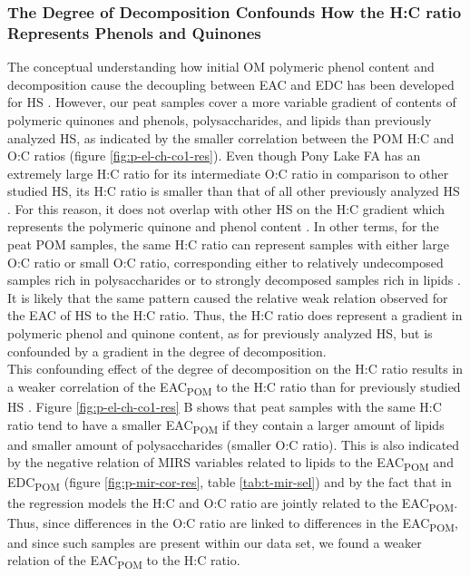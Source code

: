 \documentclass[alpha-refs]{wiley-article-rmd}
\begin{document}
\begin{refsection}
\hypertarget{the-degree-of-decomposition-confounds-how-the-hc-ratio-represents-phenols-and-quinones}{%
\subsubsection{The Degree of Decomposition Confounds How the H:C ratio Represents Phenols and Quinones}\label{the-degree-of-decomposition-confounds-how-the-hc-ratio-represents-phenols-and-quinones}}

The conceptual understanding how initial OM polymeric phenol content and decomposition cause the decoupling between EAC and EDC has been developed for HS \autocite{Aeschbacher.2012}. However, our peat samples cover a more variable gradient of contents of polymeric quinones and phenols, polysaccharides, and lipids than previously analyzed HS, as indicated by the smaller correlation between the POM H:C and O:C ratios (figure \ref{fig:p-el-ch-co1-res}). Even though Pony Lake FA has an extremely large H:C ratio for its intermediate O:C ratio in comparison to other studied HS, its H:C ratio is smaller than that of all other previously analyzed HS \autocite{Aeschbacher.2012,HuffmanLaboratories.NA}. For this reason, it does not overlap with other HS on the H:C gradient which represents the polymeric quinone and phenol content \autocite{Aeschbacher.2010}. In other terms, for the peat POM samples, the same H:C ratio can represent samples with either large O:C ratio or small O:C ratio, corresponding either to relatively undecomposed samples rich in polysaccharides or to strongly decomposed samples rich in lipids \autocite{Kim.2003,Leifeld.2012,Bader.2018}. It is likely that the same pattern caused the relative weak relation \textcite{Tan.2017} observed for the EAC of HS to the H:C ratio. Thus, the H:C ratio does represent a gradient in polymeric phenol and quinone content, as for previously analyzed HS, but is confounded by a gradient in the degree of decomposition.\\
This confounding effect of the degree of decomposition on the H:C ratio results in a weaker correlation of the EAC\textsubscript{POM} to the H:C ratio than for previously studied HS \autocite{Aeschbacher.2010}. Figure \ref{fig:p-el-ch-co1-res} B shows that peat samples with the same H:C ratio tend to have a smaller EAC\textsubscript{POM} if they contain a larger amount of lipids and smaller amount of polysaccharides (smaller O:C ratio). This is also indicated by the negative relation of MIRS variables related to lipids to the EAC\textsubscript{POM} and EDC\textsubscript{POM} (figure \ref{fig:p-mir-cor-res}, table \ref{tab:t-mir-sel}) and by the fact that in the regression models the H:C and O:C ratio are jointly related to the EAC\textsubscript{POM}. Thus, since differences in the O:C ratio are linked to differences in the EAC\textsubscript{POM}, and since such samples are present within our data set, we found a weaker relation of the EAC\textsubscript{POM} to the H:C ratio.


\end{refsection}
\end{document}
